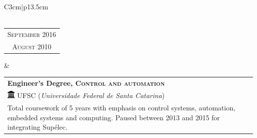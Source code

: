 \begin{tabular}{C{3cm}|p{13.5cm}}
    \\
    \\
    \begin{tabular}{c}
        \textsc{September 2016}
        \\
        \textsc{August 2010}
    \end{tabular}&
    \begin{tabular}{p{13cm}}
        \textbf{Engineer's Degree, \textsc{Control and automation}}
        \\
        \vspace{0.00cm}
        \includegraphics[height=0.4cm]{static/uni-1.png}
        UFSC (\textit{Universidade Federal de Santa Catarina})
        \vspace{0.18cm}
        \\
        Total coursework of 5 years with emphasis on control systems, automation, embedded systems and computing. Paused between 2013 and 2015 for integrating Supélec.
    \end{tabular}
\end{tabular}